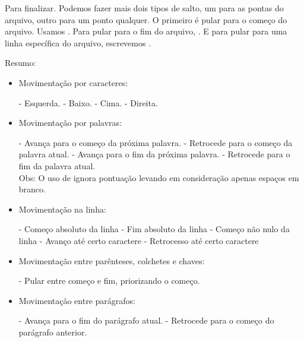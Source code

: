 Para finalizar.
Podemos fazer mais dois tipos de salto, um para as pontas do arquivo, outro para um ponto qualquer.
O primeiro é pular para o começo do arquivo.
Usamos .
Para pular para o fim do arquivo, .
E para pular para uma linha específica do arquivo, escrevemos .

Resumo:
\begin{itemize}
    \item Movimentação por caracteres:

	\begin{multicols}{2}
	\subitem {} - Esquerda.
	\subitem {} - Baixo.
	\subitem {} - Cima.
	\subitem {} - Direita.
	\end{multicols}

    \item Movimentação por palavras:

	\subitem {}  - Avança para o começo da próxima palavra.
	\subitem {}  - Retrocede para o começo da palavra atual.
	\subitem {} - Avança para o fim da próxima palavra.
	\subitem {} - Retrocede para o fim da palavra atual.\\
	Obs: O uso de  ignora pontuação levando em consideração apenas espaços em branco.

    \item Movimentação na linha:

	\begin{multicols}{2}
	\subitem {} - Começo absoluto da linha
	\subitem \vimcommand{\$} - Fim absoluto da linha
	\subitem \vimcommand{\^} - Começo não nulo da linha
	\subitem {} - Avanço até certo caractere
	\subitem {} - Retrocesso até certo caractere
\end{multicols}

    \item Movimentação entre parênteses, colchetes e chaves:

	\subitem \vimcommand{\%} - Pular entre começo e fim, priorizando o começo.

    \item Movimentação entre parágrafos:

	\subitem \vimcommand{\}} - Avança para o fim do parágrafo atual.
	\subitem \vimcommand{\{} - Retrocede para o começo do parágrafo anterior.


\end{itemize}
